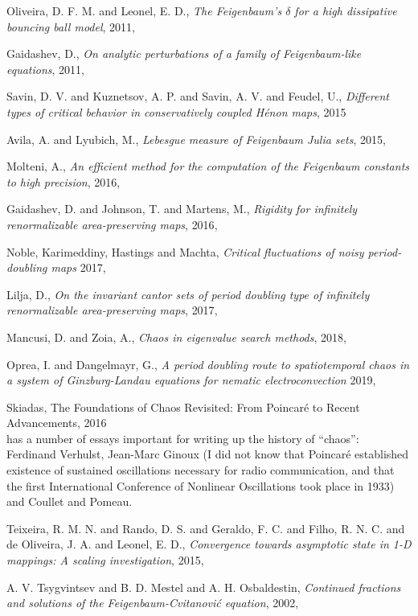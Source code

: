 \begin{description}
{Oliveira, D. F. M. and Leonel, E. D.},
{\em The {Feigenbaum}'s {$\delta$} for a high dissipative bouncing ball model},
{2011},

{Gaidashev, D.},
{\em On analytic perturbations of a family of {Feigenbaum}-like equations},
 {2011},

{Savin, D. V. and Kuznetsov, A. P. and Savin, A. V. and Feudel, U.},
{\em Different types of critical behavior in conservatively coupled {H{\'{e}}non} maps},
{2015}

{Avila, A. and Lyubich, M.},
{\em Lebesgue measure of Feigenbaum Julia sets},
{2015},

{Molteni, A.},
{\em An efficient method for the computation of the {Feigenbaum} constants to high precision},
{2016},

{Gaidashev, D. and Johnson, T. and Martens, M.},
{\em Rigidity for infinitely renormalizable area-preserving maps},
{2016},

Noble, Karimeddiny, Hastings and Machta,
{\em Critical fluctuations of noisy period-doubling maps}
{2017},

{Lilja, D.},
{\em On the invariant cantor sets of period doubling type of infinitely
renormalizable area-preserving maps},
{2017},

{Mancusi, D. and Zoia, A.},
{\em Chaos in eigenvalue search methods},
{2018},

{Oprea, I. and Dangelmayr, G.},
{\em A period doubling route to spatiotemporal chaos in a system of
{Ginzburg-Landau} equations for nematic electroconvection}
{2019},

{Skiadas},
{{The Foundations of Chaos Revisited: From Poincar{\'{e}} to Recent Advancements}},
{2016}
\\
has a number of essays important for writing up the history of ``chaos'':
Ferdinand Verhulst, Jean-Marc Ginoux (I did not know that Poincar\'e
established existence of sustained oscillations necessary for radio
communication, and that the first International Conference of Nonlinear
Oscillations took place in 1933) and
Coullet and Pomeau.

{Teixeira, R. M. N. and Rando, D. S. and Geraldo, F. C. and Filho, R. N.
C. and de Oliveira, J. A. and Leonel, E. D.},
{\em Convergence towards asymptotic state in {1-D} mappings: {A} scaling
investigation},
{2015},

{A. V. Tsygvintsev and B. D. Mestel and A. H. Osbaldestin},
{\em Continued fractions and solutions of the
{Feigenbaum-Cvitanovi{\'{c}}} equation},
{2002},


\end{description}
